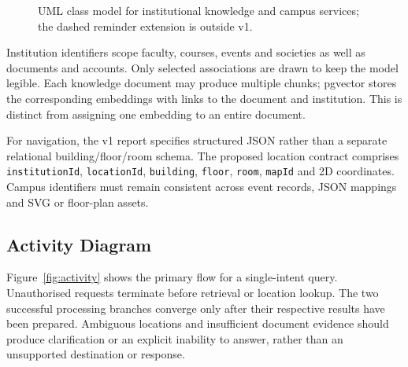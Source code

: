 \documentclass{tietreport}
\begin{document}
\begin{figure}[htbp]
\caption{UML class model for institutional knowledge and campus services; the dashed reminder extension is outside v1.}
\label{fig:class}
\end{figure}

Institution identifiers scope faculty, courses, events and societies as well
as documents and accounts. Only selected associations are drawn to keep the
model legible. Each knowledge document may produce multiple chunks; pgvector
stores the corresponding embeddings with links to the document and institution.
This is distinct from assigning one embedding to an entire document.

For navigation, the v1 report specifies structured JSON rather than a separate
relational building/floor/room schema. The proposed location contract comprises
\texttt{institutionId}, \texttt{locationId}, \texttt{building}, \texttt{floor},
\texttt{room}, \texttt{mapId} and 2D coordinates. Campus identifiers must remain
consistent across event records, JSON mappings and SVG or floor-plan assets.

\subsection{Activity Diagram}

Figure~\ref{fig:activity} shows the primary flow for a single-intent query.
Unauthorised requests terminate before retrieval or location lookup. The two
successful processing branches converge only after their respective results
have been prepared. Ambiguous locations and insufficient document evidence
should produce clarification or an explicit inability to answer, rather than
an unsupported destination or response.
\end{document}

